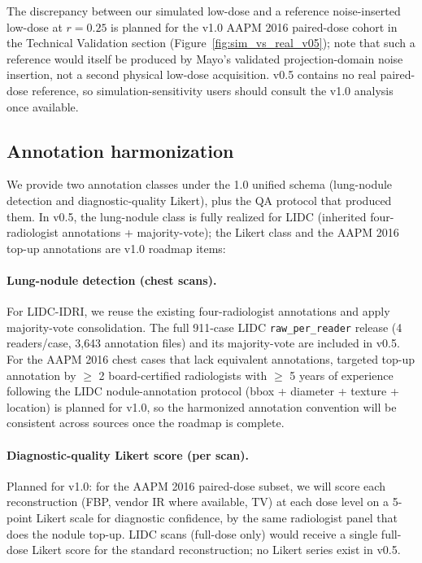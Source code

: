 \documentclass[twoside,11pt]{article}
\begin{document}
The discrepancy between our simulated low-dose and a reference noise-inserted low-dose at $r = 0.25$ is planned for the v1.0 AAPM 2016 paired-dose cohort in the Technical Validation section (Figure~\ref{fig:sim_vs_real_v05}); note that such a reference would itself be produced by Mayo's validated projection-domain noise insertion, not a second physical low-dose acquisition. v0.5 contains no real paired-dose reference, so simulation-sensitivity users should consult the v1.0 analysis once available.

\subsection*{Annotation harmonization}

We provide two annotation classes under the 1.0 unified schema (lung-nodule detection and diagnostic-quality Likert), plus the QA protocol that produced them. In v0.5, the lung-nodule class is fully realized for LIDC (inherited four-radiologist annotations + majority-vote); the Likert class and the AAPM 2016 top-up annotations are v1.0 roadmap items:

\paragraph{Lung-nodule detection (chest scans).} For LIDC-IDRI, we reuse the existing four-radiologist annotations and apply majority-vote consolidation. The full 911-case LIDC \texttt{raw\_per\_reader} release (4 readers/case, 3{,}643 annotation files) and its majority-vote are included in v0.5. For the AAPM 2016 chest cases that lack equivalent annotations, targeted top-up annotation by $\geq$ 2 board-certified radiologists with $\geq$ 5 years of experience following the LIDC nodule-annotation protocol (bbox + diameter + texture + location) is planned for v1.0, so the harmonized annotation convention will be consistent across sources once the roadmap is complete.

\paragraph{Diagnostic-quality Likert score (per scan).} Planned for v1.0: for the AAPM 2016 paired-dose subset, we will score each reconstruction (FBP, vendor IR where available, TV) at each dose level on a 5-point Likert scale for diagnostic confidence, by the same radiologist panel that does the nodule top-up. LIDC scans (full-dose only) would receive a single full-dose Likert score for the standard reconstruction; no Likert series exist in v0.5.
\end{document}
